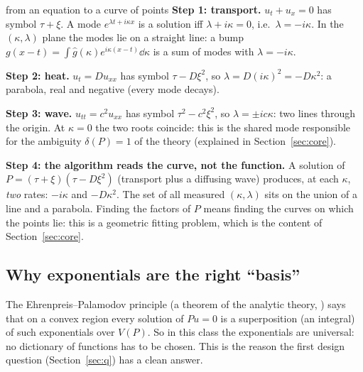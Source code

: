 \begin{explained}{from an equation to a curve of points}
\textbf{Step 1: transport.} $u_t+u_x=0$ has symbol $\tau+\xi$. A mode $e^{\lambda t+i\kappa x}$ is a solution iff $\lambda+i\kappa=0$, i.e.\ $\lambda=-i\kappa$. In the $(\kappa,\lambda)$ plane the modes lie on a straight line: a bump $g(x-t)=\int\hat g(\kappa)e^{i\kappa(x-t)}\dd\kappa$ is a sum of modes with $\lambda=-i\kappa$.

\medskip\textbf{Step 2: heat.} $u_t=Du_{xx}$ has symbol $\tau-D\xi^2$, so $\lambda=D(i\kappa)^2=-D\kappa^2$: a parabola, real and negative (every mode decays).

\medskip\textbf{Step 3: wave.} $u_{tt}=c^2u_{xx}$ has symbol $\tau^2-c^2\xi^2$, so $\lambda=\pm ic\kappa$: two lines through the origin. At $\kappa=0$ the two roots coincide: this is the shared mode responsible for the ambiguity $\delta(P)=1$ of the theory (explained in Section~\ref{sec:core}).

\medskip\textbf{Step 4: the algorithm reads the curve, not the function.} A solution of $P=(\tau+\xi)(\tau-D\xi^2)$ (transport plus a diffusing wave) produces, at each $\kappa$, \emph{two} rates: $-i\kappa$ and $-D\kappa^2$. The set of all measured $(\kappa,\lambda)$ sits on the union of a line and a parabola. Finding the factors of $P$ means finding the curves on which the points lie: this is a geometric fitting problem, which is the content of Section~\ref{sec:core}.
\end{explained}

\subsection{Why exponentials are the right ``basis''}
The Ehrenpreis--Palamodov principle (a theorem of the analytic theory, ) says that on a convex region every solution of $Pu=0$ is a superposition (an integral) of such exponentials over $V(P)$. So in this class the exponentials are universal: no dictionary of functions has to be chosen. This is the reason the first design question (Section~\ref{sec:q}) has a clean answer.

